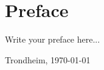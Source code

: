 \section*{\Large Preface}

\noindent Write your preface here...

\vfill

\hfill \thesisAuthor

\hfill Trondheim, \today

\cleardoublepage